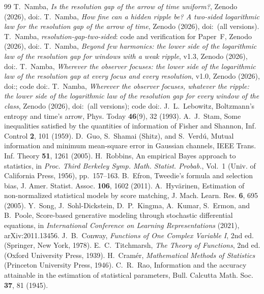 \begin{thebibliography}{99}
 T.~Namba, \emph{Is the resolution gap of the arrow of time uniform?}, Zenodo (2026), doi:\Edoi.
 T.~Namba, \emph{How fine can a hidden ripple be? A two-sided logarithmic law for the resolution gap of the arrow of time}, Zenodo (2026), doi:\Fdoi\ (all versions).
 T.~Namba, \emph{resolution-gap-two-sided}: code and verification for Paper~F, Zenodo (2026), doi:\Fcodedoi.
 T.~Namba, \emph{Beyond few harmonics: the lower side of the logarithmic law of the resolution gap for windows with a weak ripple}, v1.3, Zenodo (2026), doi:\Hdoi.
 T.~Namba, \emph{Wherever the observer focuses: the lower side of the logarithmic law of the resolution gap at every focus and every resolution}, v1.0, Zenodo (2026), doi:\Idoi; code doi:\Icodedoi.
 T.~Namba, \emph{Wherever the observer focuses, whatever the ripple: the lower side of the logarithmic law of the resolution gap for every window of the class}, Zenodo (2026), doi:\Jdoi\ (all versions); code doi:\Jcodedoi.
 J.~L.~Lebowitz, Boltzmann's entropy and time's arrow, Phys. Today \textbf{46}(9), 32 (1993).
 A.~J.~Stam, Some inequalities satisfied by the quantities of information of Fisher and Shannon, Inf. Control \textbf{2}, 101 (1959).
 D.~Guo, S.~Shamai (Shitz), and S.~Verd\'u, Mutual information and minimum mean-square error in Gaussian channels, IEEE Trans. Inf. Theory \textbf{51}, 1261 (2005).
 H.~Robbins, An empirical Bayes approach to statistics, in \emph{Proc. Third Berkeley Symp. Math. Statist. Probab.}, Vol.~1 (Univ. of California Press, 1956), pp.~157--163.
 B.~Efron, Tweedie's formula and selection bias, J. Amer. Statist. Assoc. \textbf{106}, 1602 (2011).
 A.~Hyv\"arinen, Estimation of non-normalized statistical models by score matching, J. Mach. Learn. Res. \textbf{6}, 695 (2005).
 Y.~Song, J.~Sohl-Dickstein, D.~P.~Kingma, A.~Kumar, S.~Ermon, and B.~Poole, Score-based generative modeling through stochastic differential equations, in \emph{International Conference on Learning Representations} (2021), arXiv:2011.13456.
 J.~B.~Conway, \emph{Functions of One Complex Variable I}, 2nd ed. (Springer, New York, 1978).
 E.~C.~Titchmarsh, \emph{The Theory of Functions}, 2nd ed. (Oxford University Press, 1939).
 H.~Cram\'er, \emph{Mathematical Methods of Statistics} (Princeton University Press, 1946).
 C.~R.~Rao, Information and the accuracy attainable in the estimation of statistical parameters, Bull. Calcutta Math. Soc. \textbf{37}, 81 (1945).
\end{thebibliography}
